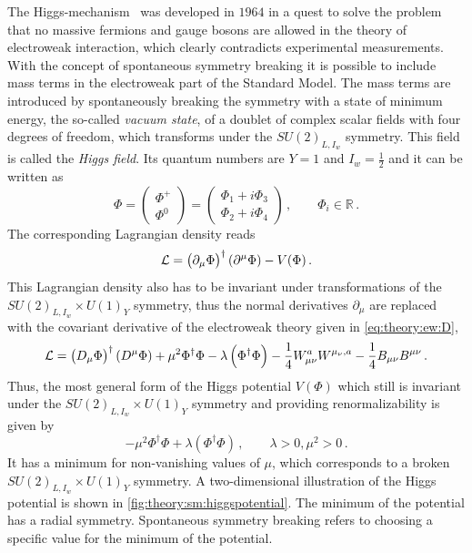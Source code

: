 The Higgs-mechanism~\cite{HiggsMecha1,HiggsMecha2,HiggsMecha3,HiggsMecha4,HiggsMecha5,HiggsMecha6} was
developed in $1964$ in a quest to solve the problem that no massive fermions and gauge bosons are allowed
in the theory of electroweak interaction, which clearly contradicts experimental measurements.
With the concept of spontaneous symmetry breaking it is possible to include mass terms in the electroweak part of the Standard Model.
The mass terms are introduced by spontaneously breaking the symmetry with a state of minimum energy, the so-called \emph{vacuum state},
of a doublet of complex scalar fields with four degrees of freedom, which transforms under the $SU(2)_{L,I_w}$ symmetry.
This field is called the \emph{Higgs field}.
Its quantum numbers are $Y = 1$ and $I_w = \frac{1}{2}$ and it can be written as~\cite{Schmuser}
\begin{equation}
    \Phi =
    \begin{pmatrix}
        \Phi^+ \\ \Phi^0
    \end{pmatrix}
    =
    \begin{pmatrix}
        \Phi_1 + i \Phi_3 \\
        \Phi_2 + i \Phi_4
    \end{pmatrix} \,, \qquad \Phi_i \in \mathbb{R} \,.
\end{equation}
The corresponding Lagrangian density reads
\begin{equation}
    \mathcal{L} = {\left(\partial_\mu\Phi\right)}^\dagger \left(\partial^\mu\Phi\right) - V(\Phi) \,.
\end{equation}
This Lagrangian density also has to be invariant under transformations of the $SU{(2)}_{L,I_w} \times U{(1)}_Y$ symmetry,
thus the normal derivatives $\partial_\mu$ are replaced with the covariant derivative of the electroweak theory given in \cref{eq:theory:ew:D},
\begin{equation}
    \mathcal{L} = {\left(D_\mu\Phi\right)}^\dagger \left(D^\mu\Phi\right) + \mu^2 \Phi^\dagger \Phi - \lambda \left(\Phi^\dagger \Phi\right) - \frac{1}{4} W_{\mu\nu}^a W^{\mu_\nu,a} - \frac{1}{4} B_{\mu\nu} B^{\mu\nu}\,.
\end{equation}
Thus, the most general form of the Higgs potential $V(\Phi)$ which still is invariant under the $SU{(2)}_{L,I_w} \times U{(1)}_Y$ symmetry and providing renormalizability
is given by
\begin{equation}
    - \mu^2 \Phi^\dagger \Phi + \lambda \left(\Phi^\dagger \Phi\right) \,, \qquad \lambda > 0 , \mu^2 > 0 \,.
\end{equation}
It has a minimum for non-vanishing values of $\mu$, which corresponds to a broken $SU{(2)}_{L,I_w} \times U{(1)}_Y$ symmetry.
A two-dimensional illustration of the Higgs potential is shown in \cref{fig:theory:sm:higgspotential}.
The minimum of the potential has a radial symmetry.
Spontaneous symmetry breaking refers to choosing a specific value for the minimum of the potential.

